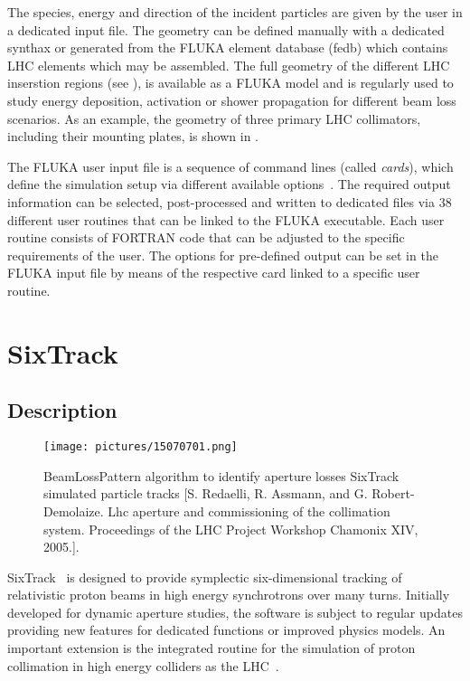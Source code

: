 The species, energy and direction of the incident particles are given by the user in a dedicated input file. The geometry can be defined manually with a dedicated synthax or generated from the FLUKA element database (fedb) which contains LHC elements which may be assembled. The full geometry of the different LHC inserstion regions (see \chapref{}), is available as a FLUKA model and is regularly used to study energy deposition, activation or shower propagation for different beam loss scenarios. As an example, the geometry of three primary LHC collimators, including their mounting plates, is shown in .

The FLUKA user input file is a sequence of command lines (called \textit{cards}), which define the simulation setup via different available options~\cite{}. The required output information can be selected, post-processed and written to dedicated files via 38 different user routines that can be linked to the FLUKA executable. Each user routine consists of FORTRAN code that can be adjusted to the specific requirements of the user. The options for pre-defined output can be set in the FLUKA input file by means of the respective card linked to a specific user routine. 


\section{SixTrack}

\subsection{Description}

\begin{figure}[b]
  \centering
  \texttt{[image: pictures/15070701.png]}
  \caption{BeamLossPattern algorithm to identify aperture losses SixTrack simulated particle tracks [S. Redaelli, R. Assmann, and G. Robert-Demolaize. Lhc aperture and commissioning
of the collimation system. Proceedings of the LHC Project Workshop
Chamonix XIV, 2005.].}  
  \label{pic:15070701}
\end{figure}

SixTrack~\cite{SixTrackref01,SixTrackref02,SixTrackref03,SixTrackref04} is designed to provide symplectic six-dimensional tracking of relativistic proton beams in high energy synchrotrons over many turns. Initially developed for dynamic aperture studies, the software is subject to regular updates providing new features for dedicated functions or improved physics models. An important extension is the integrated routine for the simulation of proton collimation in high energy colliders as the LHC~\cite{1591725,collsixtrack}. \

